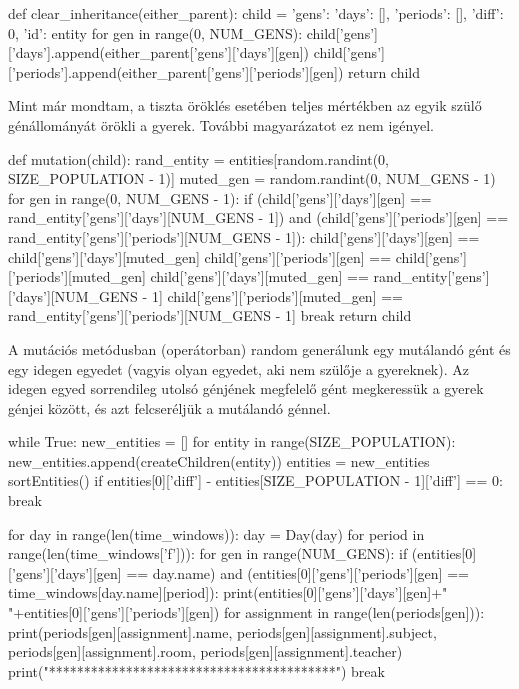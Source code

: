 \documentclass[a4paper,12pt]{article}
\begin{document}
\begin{python}
def clear_inheritance(either_parent):
    child = {'gens': {'days': [], 'periods': []}, 'diff': 0, 'id': entity}
    for gen in range(0, NUM_GENS):
        child['gens']['days'].append(either_parent['gens']['days'][gen])
        child['gens']['periods'].append(either_parent['gens']['periods'][gen])
    return child

Mint már mondtam, a tiszta öröklés esetében teljes mértékben az egyik szülő génállományát örökli a gyerek. További magyarázatot ez nem igényel.

def mutation(child):
    rand_entity = entities[random.randint(0, SIZE_POPULATION - 1)]
    muted_gen = random.randint(0, NUM_GENS - 1)
    for gen in range(0, NUM_GENS - 1):
        if (child['gens']['days'][gen] == rand_entity['gens']['days'][NUM_GENS - 1]) and (child['gens']['periods'][gen] == rand_entity['gens']['periods'][NUM_GENS - 1]):
            child['gens']['days'][gen] == child['gens']['days'][muted_gen]
            child['gens']['periods'][gen] == child['gens']['periods'][muted_gen]
            child['gens']['days'][muted_gen] == rand_entity['gens']['days'][NUM_GENS - 1]
            child['gens']['periods'][muted_gen] == rand_entity['gens']['periods'][NUM_GENS - 1]
            break
    return child
\end{python}

A mutációs metódusban (operátorban) random generálunk egy mutálandó gént és egy idegen egyedet (vagyis olyan egyedet, aki nem szülője a gyereknek). Az idegen egyed sorrendileg utolsó génjének megfelelő gént megkeressük a gyerek génjei között, és azt felcseréljük a mutálandó génnel.

\begin{python}
while True:
    new_entities = []
    for entity in range(SIZE_POPULATION):
        new_entities.append(createChildren(entity))
    entities = new_entities
    sortEntities()
    if entities[0]['diff'] - entities[SIZE_POPULATION - 1]['diff'] == 0:
        break

for day in range(len(time_windows)):
    day = Day(day)
    for period in range(len(time_windows['f'])):
        for gen in range(NUM_GENS):
            if (entities[0]['gens']['days'][gen] == day.name) and (entities[0]['gens']['periods'][gen] == time_windows[day.name][period]):
                print(entities[0]['gens']['days'][gen]+" "+entities[0]['gens']['periods'][gen])
                for assignment in range(len(periods[gen])):
                    print(periods[gen][assignment].name, periods[gen][assignment].subject, periods[gen][assignment].room, periods[gen][assignment].teacher)
                print("*****************************************")
                break
\end{python}
\end{document}
